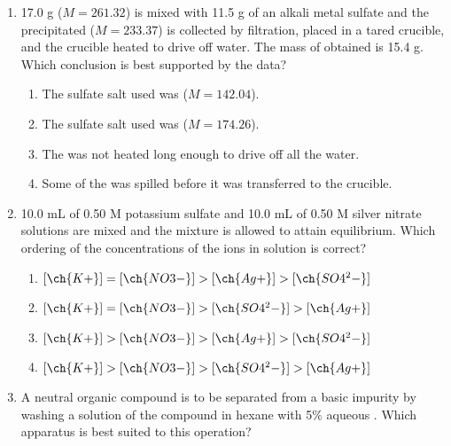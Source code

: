 \documentclass[twocolumn, 10pt]{article}
\begin{document}
\begin{enumerate}
    \item 17.0 g  ($M = 261.32$) is mixed with 11.5 g of an alkali metal sulfate and the precipitated  ($M = 233.37$) is collected by filtration, placed in a tared crucible, and the crucible heated to drive off water. The mass of  obtained is 15.4 g. Which conclusion is best supported by the data?
    \begin{enumerate}
        \item The sulfate salt used was  ($M = 142.04$).
        \item The sulfate salt used was  ($M = 174.26$).
        \item The  was not heated long enough to drive off all the water.
        \item Some of the  was spilled before it was transferred to the crucible.
    \end{enumerate}

    \item 10.0 mL of 0.50 M potassium sulfate and 10.0 mL of 0.50 M silver nitrate solutions are mixed and the mixture is allowed to attain equilibrium. Which ordering of the concentrations of the ions in solution is correct?
    \begin{enumerate}
        \item $[\ch{K+}] = [\ch{NO3-}] > [\ch{Ag+}] > [\ch{SO4^2-}]$
        \item $[\ch{K+}] = [\ch{NO3-}] > [\ch{SO4^2-}] > [\ch{Ag+}]$
        \item $[\ch{K+}] > [\ch{NO3-}] > [\ch{Ag+}] > [\ch{SO4^2-}]$
        \item $[\ch{K+}] > [\ch{NO3-}] > [\ch{SO4^2-}] > [\ch{Ag+}]$
    \end{enumerate}

    \item A neutral organic compound is to be separated from a basic impurity by washing a solution of the compound in hexane with 5\% aqueous . Which apparatus is best suited to this operation?
    
    \begin{center}
\end{center}
\end{enumerate}
\end{document}
